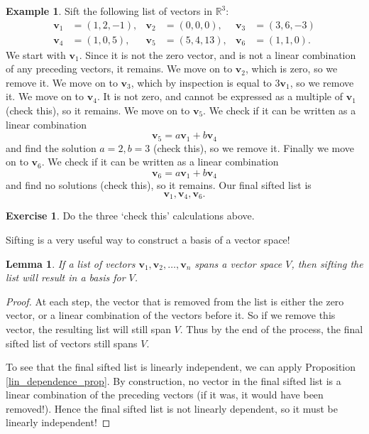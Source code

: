 \documentclass[a4paper,11pt]{book}
\newtheorem{lemma}[theorem]{Lemma}
\theoremstyle{definition}
\newtheorem{exercise}{Exercise}
\newtheorem{example_environment}{Example}[chapter]
\newcommand{\ve}[1]{\mathbf{#1}}
\newenvironment{example}
	{
		\begin{oframed} 
		\begin{example_environment}
	}
	{
		\end{example_environment}
		\end{oframed}
	}
\begin{document}
\begin{example} Sift the following list of vectors in $\mathbb{R}^3$:
\begin{align*}
\ve{v}_1 &= (1,2,-1), & \ve{v}_2 &= (0, 0, 0), & \ve{v}_3 &= (3, 6, -3) \\
\ve{v}_4 &= (1, 0, 5), & \ve{v}_5 &= (5, 4, 13), &  \ve{v}_6 &= (1, 1, 0).
\end{align*}
We start with $\ve{v}_1$. Since it is not the zero vector, and is not a linear combination of any preceding vectors, it remains. We move on to $\ve{v}_2$, which is zero, so we remove it. We move on to $\ve{v}_3$, which by inspection is equal to $3 \ve{v}_1$, so we remove it. We move on to $\ve{v}_4$. It is not zero, and cannot be expressed as a multiple of $\ve{v}_1$ (check this), so it remains. We move on to $\ve{v}_5$. We check if it can be written as a linear combination
\[
 \ve{v}_5 = a\ve{v}_1 + b \ve{v}_4
\] 
and find the solution $a=2, b=3$ (check this), so we remove it. Finally we move on to $\ve{v}_6$. We check if it can be written as a linear combination
\[
 \ve{v}_6 = a\ve{v}_1 + b \ve{v}_4
\] 
and find no solutions (check this), so it remains. Our final sifted list is
\[
 \ve{v}_1, \ve{v}_4, \ve{v}_6.
\]
\begin{exercise} Do the three `check this' calculations above.
\end{exercise}
\end{example}

Sifting is a very useful way to construct a basis of a vector space!

\begin{lemma} \label{sift_lemma_basis} If a list of vectors $\ve{v}_1, \ve{v}_2, \ldots, \ve{v}_n$ spans a vector space $V$, then sifting the list will result in a basis for $V$.
\end{lemma}
\begin{proof} At each step, the vector that is removed from the list is either the zero vector, or a linear combination of the vectors before it. So if we remove this vector, the resulting list will still span $V$. Thus by the end of the process, the final sifted list of vectors still spans $V$. 

To see that the final sifted list is linearly independent, we can apply Proposition \ref{lin_dependence_prop}. By construction, no vector in the final sifted list is a linear combination of the preceding vectors (if it was, it would have been removed!). Hence the final sifted list is not linearly dependent, so it must be linearly independent!
\end{proof}
\end{document}
